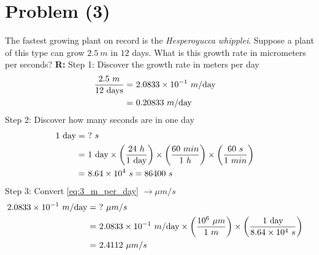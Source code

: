 \section{Problem (3)}
	The fastest growing plant on record is the \emph{Hesperoyucca whipplei}. Suppose a plant of this type can grow $2.5 \ m$ in $12$ days. What is this growth rate in micrometers per seconds? \newline
	\textbf{R:} \newline
	Step 1: Discover the growth rate in meters per day
	\begin{align}
		\frac{2.5 \ m}{12 \ \text{days}}
		= \ & 2.0833 \times 10^{-1} \ m/\text{day}& \notag \\
		= \ & 0.20833 \ m/\text{day}&
		\label{eq:3_m_per_day}
	\end{align}
	Step 2: Discover how many seconds are in one day
	\begin{align}
		1 \ \text{day} = \ & ? \ s & \notag \\
		= \ & 1 \ \text{day}
		\times \left( \frac{24 \ h}{1 \ \text{day}} \right)
		\times \left( \frac{60 \ min}{1 \ h} \right)
		\times \left( \frac{60 \ s}{1 \ min} \right)& \notag \\
		= \ & 8.64 \times 10^{4} \ s = 86400 \ s&
	\end{align}
	Step 3: Convert \cref{eq:3_m_per_day} $\to \mu m / s$
	\begin{align}
		2.0833 \times 10^{-1} \ m/\text{day} = \ & ? \ \mu m / s & \notag \\
		= \ & 2.0833 \times 10^{-1} \ m / \text{day}
		\times \left( \frac{10^{6} \ \mu m}{1 \ m} \right)
		\times \left( \frac{1 \ \text{day}}{8.64 \times 10^{4} \ s} \right)& \notag \\
		= \ &2.4112 \ \mu m / s&
	\end{align}
